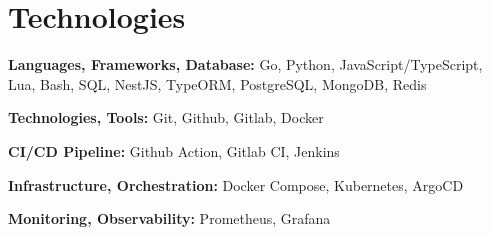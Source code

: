 \section{Technologies}

\begin{onecolentry}
	\textbf{Languages, Frameworks, Database:}
	Go,
	Python,
	JavaScript/TypeScript,
	Lua,
	Bash,
	SQL,
	NestJS,
	TypeORM,
	PostgreSQL,
	MongoDB,
	Redis
\end{onecolentry}

\vspace{0.2 cm}

\begin{onecolentry}
	\textbf{Technologies, Tools:}
	Git,
	Github,
	Gitlab,
	Docker
\end{onecolentry}

\vspace{0.2 cm}

\begin{onecolentry}
	\textbf{CI/CD Pipeline:}
	Github Action,
	Gitlab CI,
	Jenkins
\end{onecolentry}

\vspace{0.2 cm}

\begin{onecolentry}
	\textbf{Infrastructure, Orchestration:}
	Docker Compose,
	Kubernetes,
	ArgoCD
\end{onecolentry}

\vspace{0.2 cm}

\begin{onecolentry}
	\textbf{Monitoring, Observability:}
	Prometheus,
	Grafana
\end{onecolentry}

%
%
%

\vspace{0.2 cm}
